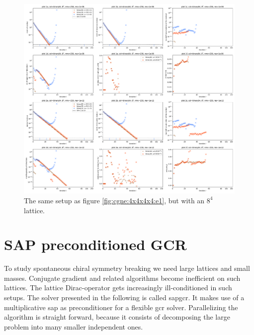 \documentclass{article}
\theoremstyle{plain} %
\theoremstyle{convention} %
\theoremstyle{remark} %
\numberwithin{equation}{section}
\begin{document}
\begin{figure}[h]
    \centering
    \includegraphics[width=1.0\textwidth]{plots/cgne_8x8x8x8_e1}
    \caption{The same setup as figure \ref{fig:cgne:4x4x4x4:e1}, but with an $8^4$ lattice.}
    \label{fig:cgne:8x8x8x8:e1}
\end{figure}

\section{SAP preconditioned GCR}

\label{sec:sap_gcr}

To study spontaneous chiral symmetry breaking we need large lattices and small masses. Conjugate gradient and related algorithms become inefficient on such lattices. The lattice Dirac-operator gets increasingly ill-conditioned in such setups. The solver presented in the following is called \acrshort{sapgcr}. It makes use of a multiplicative \acrfull{sap} as preconditioner for a flexible \acrfull{gcr} solver. Parallelizing the algorithm is straight forward, because it consists of decomposing the large problem into many smaller independent ones.
\end{document}
